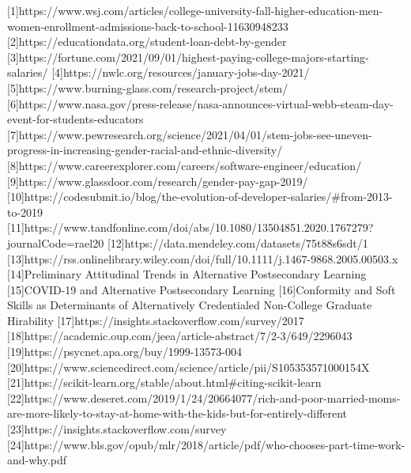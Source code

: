 \documentclass[review]{elsarticle}
\begin{document}
[1]https://www.wsj.com/articles/college-university-fall-higher-education-men-women-enrollment-admissions-back-to-school-11630948233
[2]https://educationdata.org/student-loan-debt-by-gender
[3]https://fortune.com/2021/09/01/highest-paying-college-majors-starting-salaries/
[4]https://nwlc.org/resources/january-jobs-day-2021/
[5]https://www.burning-glass.com/research-project/stem/
[6]https://www.nasa.gov/press-release/nasa-announces-virtual-webb-steam-day-event-for-students-educators
[7]https://www.pewresearch.org/science/2021/04/01/stem-jobs-see-uneven-progress-in-increasing-gender-racial-and-ethnic-diversity/
[8]https://www.careerexplorer.com/careers/software-engineer/education/
[9]https://www.glassdoor.com/research/gender-pay-gap-2019/
[10]https://codesubmit.io/blog/the-evolution-of-developer-salaries/#from-2013-to-2019
[11]https://www.tandfonline.com/doi/abs/10.1080/13504851.2020.1767279?journalCode=rael20
[12]https://data.mendeley.com/datasets/75t88s6sdt/1
[13]https://rss.onlinelibrary.wiley.com/doi/full/10.1111/j.1467-9868.2005.00503.x
[14]Preliminary Attitudinal Trends in Alternative Postsecondary Learning
[15]COVID-19 and Alternative Postsecondary Learning
[16]Conformity and Soft Skills as Determinants of Alternatively Credentialed Non-College Graduate Hirability
[17]https://insights.stackoverflow.com/survey/2017
[18]https://academic.oup.com/jeea/article-abstract/7/2-3/649/2296043
[19]https://psycnet.apa.org/buy/1999-13573-004
[20]https://www.sciencedirect.com/science/article/pii/S105353571000154X
[21]https://scikit-learn.org/stable/about.html#citing-scikit-learn
[22]https://www.deseret.com/2019/1/24/20664077/rich-and-poor-married-moms-are-more-likely-to-stay-at-home-with-the-kids-but-for-entirely-different
[23]https://insights.stackoverflow.com/survey
[24]https://www.bls.gov/opub/mlr/2018/article/pdf/who-chooses-part-time-work-and-why.pdf
\end{document}
